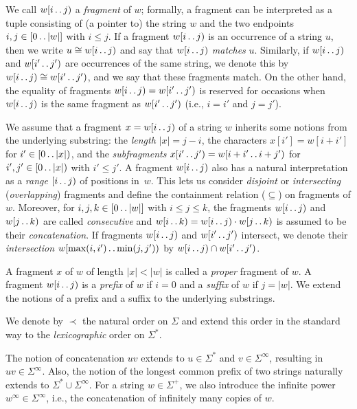 \documentclass[a4paper]{article}
\theoremstyle{definition}
\theoremstyle{remark}
\newcommand{\sub}{\subseteq}
\newcommand{\dd}{\mathinner{\ldotp\ldotp}}
\begin{document}
We call $w[i\dd j)$ a \emph{fragment} of $w$; formally, a fragment can be interpreted as a tuple
consisting of (a pointer to) the string $w$ and the two endpoints $i,j\in [0\dd |w|]$ with $i\le j$.
If a fragment $w[i\dd j)$ is an occurrence of a string $u$, then we write $u\cong w[i\dd j)$ and say that $w[i\dd j)$ \emph{matches} $u$.
Similarly, if $w[i\dd j)$ and $w[i'\dd j')$ are occurrences of the same string, we denote this by $w[i\dd j)\cong w[i'\dd j')$,
and we say that these fragments match.
On the other hand, the equality of fragments $w[i\dd j)=w[i'\dd j')$ is reserved for occasions when $w[i\dd j)$ is the same fragment as $w[i'\dd j')$ (i.e., $i=i'$ and $j=j'$). 

We assume that a fragment $x=w[i\dd j)$ of a string $w$ inherits some notions from the underlying substring: the \emph{length} $|x|=j-i$, the characters $x[i']=w[i+i']$ for $i'\in [0\dd |x|)$, and the \emph{subfragments} $x[i'\dd j')=w[i+i'\dd i+j')$ for $i',j'\in [0\dd |x|)$ with $i'\le j'$.
A fragment $w[i\dd j)$ also has a natural interpretation as a \emph{range} $[i\dd j)$ of positions in~$w$.
This lets us consider \emph{disjoint} or \emph{intersecting} (\emph{overlapping}) fragments and define the containment relation ($\sub$) on fragments of $w$. 
Moreover, for $i,j,k\in [0\dd |w|]$ with $i\le j \le k$, the fragments $w[i\dd j)$ and $w[j\dd k)$ are called \emph{consecutive} and $w[i\dd k)=w[i\dd j)\cdot w[j\dd k)$ is assumed to be their \emph{concatenation}.
If fragments $w[i\dd j)$ and $w[i'\dd j')$ intersect, we denote their \emph{intersection} $w[\max(i,i')\dd \min(j,j'))$ by $w[i\dd j)\cap w[i'\dd j')$.
 
A fragment $x$ of $w$ of length $|x|<|w|$ is called a \emph{proper} fragment of $w$.
A fragment $w[i\dd j)$ is a \emph{prefix} of $w$ if $i=0$ and a \emph{suffix} of $w$ if $j=|w|$.
We extend the notions of a prefix and a suffix to the underlying substrings.  


We denote by $\prec$ the natural order on $\Sigma$
and extend this order in the standard way to the \emph{lexicographic} order on $\Sigma^{*}$.

The notion of concatenation $uv$ extends to $u\in \Sigma^*$ and $v\in \Sigma^\infty$, resulting in $uv\in \Sigma^{\infty}$.
Also, the notion of the longest common prefix of two strings naturally extends to $\Sigma^*\cup \Sigma^\infty$.
For a string $w\in \Sigma^+$, we also introduce the infinite power $w^\infty\in \Sigma^\infty$, i.e., the concatenation of infinitely many copies of $w$.
\end{document}
